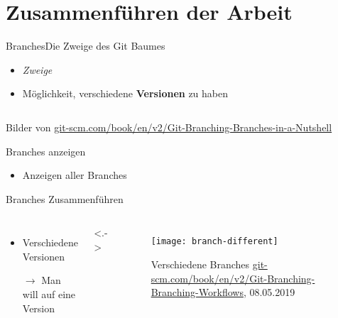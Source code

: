 \documentclass{beamer}
\begin{document}
  \section[Merge]{Zusammenführen der Arbeit}


    \begin{frame}{Branches}{Die Zweige des Git Baumes}
      \begin{itemize}
        \item<+-> \textit{Zweige}
        \item<+-> Möglichkeit, verschiedene \textbf{Versionen} zu haben
      \end{itemize}
      \begin{columns}
       \end{columns}
      \tiny{Bilder von \url{git-scm.com/book/en/v2/Git-Branching-Branches-in-a-Nutshell}}
    \end{frame}

    \begin{frame}{Branches anzeigen}
      \begin{itemize}
        \item<+-> Anzeigen aller Branches
      \end{itemize}
    \end{frame}

    \begin{frame}{Branches Zusammenführen}
      \begin{columns}
          \begin{itemize}[<+->]
            \item Verschiedene Versionen
            \item[$\rightarrow$] Man will auf eine Version
          \end{itemize}

          \onslide<.->{
            \begin{figure}
              \texttt{[image: branch-different]}
              \caption{Verschiedene Branches \tiny{\url{git-scm.com/book/en/v2/Git-Branching-Branching-Workflows}, 08.05.2019}}
            \end{figure}
          }
      \end{columns}
    \end{frame}
\end{document}
